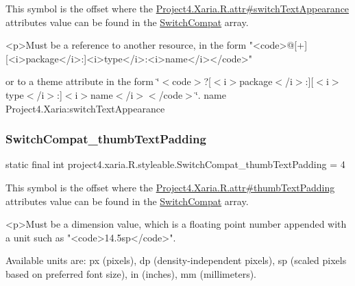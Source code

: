 This symbol is the offset where the \hyperlink{}{Project4.\+Xaria.\+R.\+attr\#switch\+Text\+Appearance} attribute\textquotesingle{}s value can be found in the \hyperlink{classproject4_1_1xaria_1_1R_1_1styleable_a15d9950df3a97e57d9c57e4c4b7e8e87}{Switch\+Compat} array.

\begin{DoxyVerb}      <p>Must be a reference to another resource, in the form "<code>@[+][<i>package</i>:]<i>type</i>:<i>name</i></code>"
\end{DoxyVerb}
 or to a theme attribute in the form \char`\"{}$<$code$>$?\mbox{[}$<$i$>$package$<$/i$>$\+:\mbox{]}\mbox{[}$<$i$>$type$<$/i$>$\+:\mbox{]}$<$i$>$name$<$/i$>$$<$/code$>$\char`\"{}.  name Project4.\+Xaria\+:switch\+Text\+Appearance \mbox{\label{classproject4_1_1xaria_1_1R_1_1styleable_ad2019cfb3db37eb7854eb363ab28b13c}} 
\subsubsection{\texorpdfstring{Switch\+Compat\+\_\+thumb\+Text\+Padding}{SwitchCompat\_thumbTextPadding}}
{\footnotesize\ttfamily static final int project4.\+xaria.\+R.\+styleable.\+Switch\+Compat\+\_\+thumb\+Text\+Padding = 4\hspace{0.3cm}{\ttfamily [static]}}

This symbol is the offset where the \hyperlink{}{Project4.\+Xaria.\+R.\+attr\#thumb\+Text\+Padding} attribute\textquotesingle{}s value can be found in the \hyperlink{classproject4_1_1xaria_1_1R_1_1styleable_a15d9950df3a97e57d9c57e4c4b7e8e87}{Switch\+Compat} array.

\begin{DoxyVerb}      <p>Must be a dimension value, which is a floating point number appended with a unit such as "<code>14.5sp</code>".
\end{DoxyVerb}
 Available units are\+: px (pixels), dp (density-\/independent pixels), sp (scaled pixels based on preferred font size), in (inches), mm (millimeters). 

